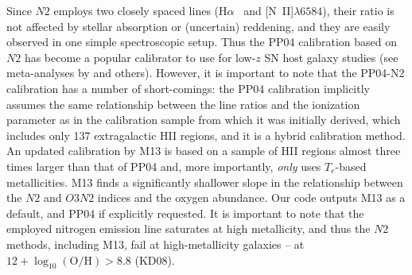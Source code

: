 \documentclass{emulateapj}
\newcommand{\oxabinline}{\ensuremath{12 + \log_{10}(\mathrm{O}/\mathrm{H})}}
\newcommand{\ha}{\ensuremath{\mathrm{H}\alpha}}
\newcommand{\hb}{\ensuremath{\mathrm{H}\beta}}
\begin{document}



Since $N2$ employs two closely spaced lines (\ha~ and
[N~II]$\lambda6584$), their ratio is not affected by stellar
absorption or (uncertain) reddening, and they are easily observed in
one simple spectroscopic setup. Thus the PP04 calibration based on
$N2$ has become a popular calibrator to use for low-$z$ SN host galaxy
studies (see meta-analyses by
\citealt{sanders12,modjaz12_proc,leloudas14} and others). However, it
is important to note that the PP04-N2 calibration has a number of
short-comings: the PP04 calibration implicitly assumes the same
relationship between the line ratios and the ionization parameter as
in the calibration sample from which it was initially derived, which
includes only 137 extragalactic HII regions, and it is a hybrid
calibration method. An updated calibration by M13 is based on a sample
of HII regions almost three times larger than that of PP04 and, more
importantly, \emph{only} uses $T_e$-based metallicities. M13 finds a
significantly shallower slope in the relationship between the $N2$ and
$O3N2$ indices and the oxygen abundance. Our code outputs M13 as a
default, and PP04 if explicitly requested.  It is important to note
that the employed nitrogen emission line saturates at high
metallicity, and thus the $N2$ methods, including M13, fail at
high-metallicity galaxies -- at $\oxabinline > 8.8$ (KD08).
\end{document}
